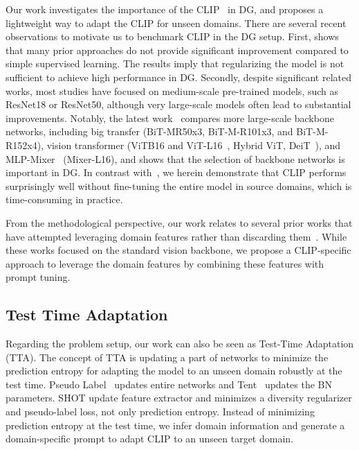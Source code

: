 \documentclass[letterpaper]{article} \usepackage[]{aaai23}
\begin{document}
Our work investigates the importance of the CLIP~\cite{radford2021learning} in DG, and proposes a lightweight way to adapt the CLIP for unseen domains. 
There are several recent observations to motivate us to benchmark CLIP in the DG setup. 
First, \cite{gulrajani2020search} shows that many prior approaches do not provide significant improvement compared to simple supervised learning. 
The results imply that regularizing the model is not sufficient to achieve high performance in DG. 
Secondly, despite significant related works, most studies have focused on medium-scale pre-trained models, such as ResNet18 or ResNet50, although very large-scale models often lead to substantial improvements.
Notably, the latest work~\cite{iwasawa2021testtime} compares more large-scale backbone networks, including big transfer \cite{kolesnikov2020big} (BiT-MR50x3, BiT-M-R101x3, and BiT-M-R152x4), vision transformer (ViTB16 and ViT-L16~\cite{dosovitskiy2020image}, Hybrid ViT, DeiT~\cite{touvron2021training}), and MLP-Mixer~\cite{tolstikhin2021mlpmixer} (Mixer-L16), and shows that the selection of backbone networks is important in DG.
In contrast with~\cite{iwasawa2021testtime}, we herein demonstrate that CLIP performs surprisingly well without fine-tuning the entire model in source domains, which is time-consuming in practice.

From the methodological perspective, our work relates to several prior works that have attempted leveraging domain features rather than discarding them~\cite{ganin2016domainadversarial,zhou2020deep,borlino2021rethinking}. 
While these works focused on the standard vision backbone, we propose a CLIP-specific approach to leverage the domain features by combining these features with prompt tuning. 

\subsection{Test Time Adaptation}
\label{sec:tta}
Regarding the problem setup, our work can also be seen as Test-Time Adaptation (TTA).
The concept of TTA is updating a part of networks to minimize the prediction entropy for adapting the model to an unseen domain robustly at the test time.
Pseudo Label~\cite{lee2013pseudo} updates entire networks and Tent~\cite{wang2020tent} updates the BN parameters.
SHOT\cite{liang2020we} update feature extractor and minimizes a diversity regularizer and pseudo-label loss, not only prediction entropy.
Instead of minimizing prediction entropy at the test time, we infer domain information and generate a domain-specific prompt to adapt CLIP to an unseen target domain.
\end{document}

